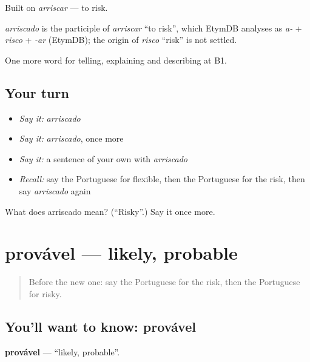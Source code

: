 Built on \emph{arriscar} — to risk.

\begin{cousinweb}
\emph{arriscado} is the participle of \emph{arriscar} \textquotedblleft{}to risk\textquotedblright{}, which EtymDB analyses as \emph{a-} + \emph{risco} + \emph{-ar} (EtymDB); the origin of \emph{risco} \textquotedblleft{}risk\textquotedblright{} is not settled.
\end{cousinweb}

\begin{grammarlens}[title={What you've built}]
One more word for telling, explaining and describing at B1.
\end{grammarlens}

\subsection*{Your turn}
\begin{itemize}
\raggedright
  \item \emph{Say it:} \emph{arriscado}
  \item \emph{Say it:} \emph{arriscado}, once more
  \item \emph{Say it:} a sentence of your own with \emph{arriscado}
  \item \emph{Recall:} say the Portuguese for flexible, then the Portuguese for the risk, then say \emph{arriscado} again
\end{itemize}

\begin{tcolorbox}[breakable,colback=teal!4,colframe=teal!35!black,title={Before you move on}]
What does arriscado mean? (\textquotedblleft{}Risky\textquotedblright{}.) Say it once more.
\end{tcolorbox}
\section[provável]{provável — likely, probable}

\label{lesson:PT-C373-provavel}



\begin{quote}
Before the new one: say the Portuguese for the risk, then the Portuguese for risky.
\end{quote}

\subsection*{You'll want to know: provável}
\textbf{provável} — \textquotedblleft{}likely, probable\textquotedblright{}.


